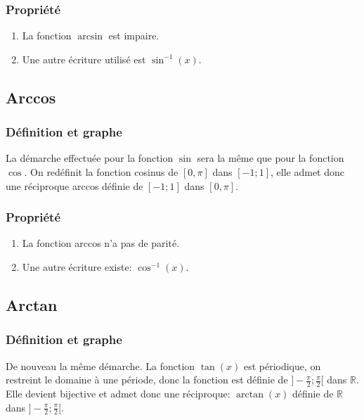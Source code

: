 \documentclass[12pt,a4paper]{report}
\begin{document}
	\subsubsection*{Propriété}
	\begin{enumerate}
		\item La fonction $\arcsin$ est impaire.
		\item Une autre écriture utilisé est $\sin^{-1}(x)$.
	\end{enumerate}
	\subsection*{Arccos}
	\subsubsection*{Définition et graphe}
	La démarche effectuée pour la fonction $\sin$ sera la même que pour la fonction $\cos$. On redéfinit la fonction cosinus de $[0,\pi]$ dans $[-1;1]$, elle admet donc une réciproque arccos définie de $[-1;1]$ dans $[0,\pi]$.
	
	
	\subsubsection*{Propriété}
	\begin{enumerate}
		\item La fonction arccos n'a pas de parité.
		\item Une autre écriture existe: $\cos^{-1}(x)$.
	\end{enumerate}
	\subsection*{Arctan}
	\subsubsection*{Définition et graphe}
	De nouveau la même démarche. La fonction $\tan(x)$ est périodique, on restreint le domaine à une période, donc la fonction est définie de $]-\frac{\pi}{2};\frac{\pi}{2}[$ dans $\mathbb{R}$. Elle devient bijective et admet donc une réciproque: $\arctan(x)$ définie de $\mathbb{R}$ dans $]-\frac{\pi}{2};\frac{\pi}{2}[$.
	
\end{document}
